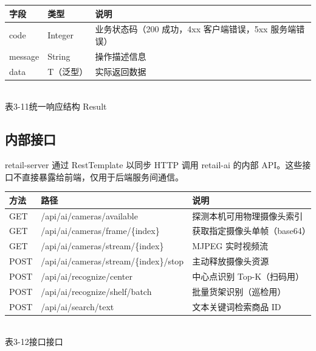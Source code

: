 \begin{center}
  \renewcommand{\arraystretch}{1.4}
  \begin{tabular}{|>{\centering\arraybackslash}m{1.3cm}|>{\centering\arraybackslash}m{1.8cm}|>{\centering\arraybackslash}m{9.6cm}|}
    \hline
    \textbf{字段} & \textbf{类型} & \textbf{说明}                       \\ \hline
    code        & Integer     & 业务状态码（200 成功，4xx 客户端错误，5xx 服务端错误） \\ \hline
    message     & String      & 操作描述信息                            \\ \hline
    data        & T（泛型）       & 实际返回数据                            \\ \hline
  \end{tabular}
  \\[0.3em]
  {表3-11\quad 统一响应结构 Result}
\end{center}

\subsection{内部接口}

retail-server 通过 RestTemplate 以同步 HTTP 调用 retail-ai 的内部
API。这些接口不直接暴露给前端，仅用于后端服务间通信。

\begin{center}
  \renewcommand{\arraystretch}{1.4}
  \begin{tabular}{|>{\centering\arraybackslash}m{1.5cm}|>{\centering\arraybackslash}m{6.0cm}|>{\centering\arraybackslash}m{5.2cm}|}
    \hline
    \textbf{方法} & \textbf{路径}                           & \textbf{说明}       \\ \hline
    GET         & /api/ai/cameras/available             & 探测本机可用物理摄像头索引     \\ \hline
    GET         & /api/ai/cameras/frame/\{index\}       & 获取指定摄像头单帧（base64） \\ \hline
    GET         & /api/ai/cameras/stream/\{index\}      & MJPEG 实时视频流       \\ \hline
    POST        & /api/ai/cameras/stream/\{index\}/stop & 主动释放摄像头资源         \\ \hline
    POST        & /api/ai/recognize/center              & 中心点识别 Top-K（扫码用）  \\ \hline
    POST        & /api/ai/recognize/shelf/batch         & 批量货架识别（巡检用）       \\ \hline
    POST        & /api/ai/search/text                   & 文本关键词检索商品 ID      \\ \hline
  \end{tabular}
  \\[0.3em]
  {表3-12\quad 接口接口}
\end{center}

